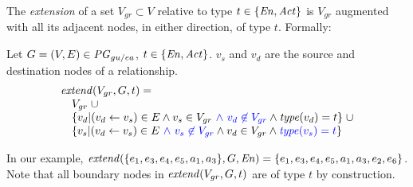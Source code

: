 %
The \textit{extension} of a set $V_{gr} \subset V$ relative to type $t \in \{ \mathit{En}, \mathit{Act} \}$ is $V_{gr}$ augmented with all its adjacent nodes, in either direction, of type $t$. Formally:





\vspace*{10pt}
\begin{definition}[$\extend$]
Let $G = (V,E) \in \mathit{PG}_{gu/ea}$, $t \in \{ \mathit{En}, \mathit{Act} \}$. $v_s$ and $v_d$ are the source and destination nodes of a relationship. 
\[
\begin{array}{l}
\extend(V_{gr}, G ,t) =  \\
\quad V_{gr} \;\cup \\ 
\quad    \{ v_d | (v_d \leftarrow v_s) \in E \wedge v_s \in V_{gr} \jwb{~\wedge\ v_d \nin V_{gr}} \wedge \type(v_d) = t \} \;\cup \\
\quad   \{ v_s | (v_d \leftarrow v_s) \in E  \jwb{~\wedge\ v_s \nin V_{gr}} \wedge v_d \in V_{gr}  \wedge \jwb{\type(v_s) = t} \}  \\
\end{array}
\]


\end{definition}


%
In our example, $\mathit{extend}(\{e_1, e_3, e_4, e_5, a_1, a_3\}, G, \mathit{En}) = \{e_1, e_3, e_4, e_5, a_1, a_3, e_2, e_6\}$.  Note that all boundary nodes in $\mathit{extend}(V_{gr}, G, t)$ are of type $t$ by construction.

